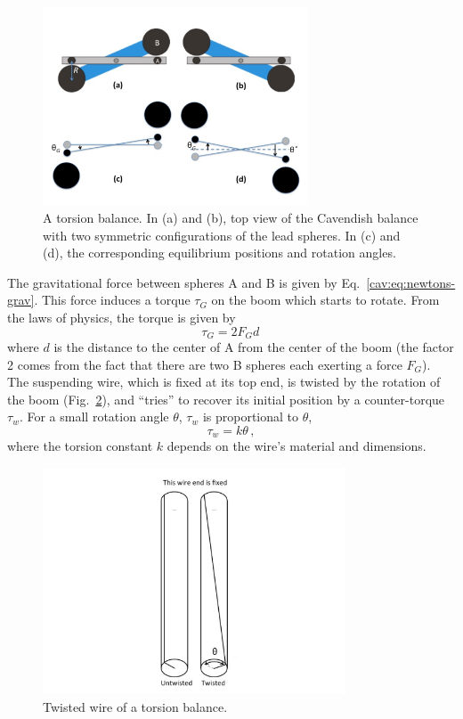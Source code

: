 \begin{figure}
	\centering
	\includegraphics[width=0.7\textwidth]{cavendish/tel-rp2111-booms}
	\caption{A torsion balance. In (a) and (b), top view of the Cavendish balance with two
		symmetric configurations of the lead spheres. In (c) and (d), the corresponding
		equilibrium positions and rotation angles.}\label{cav:fig:setup-booms}
\end{figure}

The gravitational force between spheres A and B is given by Eq.~\ref{cav:eq:newtons-grav}. This force induces a torque $\tau_G$ on the boom which starts to rotate. From the laws of
physics, the torque is given by
\begin{equation}
 \tau_G = 2 F_G d \,
\end{equation}
where $d$ is the distance to the center of A from the center of the boom (the factor 2 comes
from the fact that there are two B spheres each exerting a force $F_G$). The suspending
wire, which is fixed at its top end, is twisted by the rotation of the boom (Fig.~\ref{cav:fig:torsion}), and
``tries'' to recover its initial position by a counter-torque $\tau_w$. For a small rotation angle $\theta$,
$\tau_w$ is proportional to $\theta$,
\begin{equation}
 \tau_w = k \theta\,,
\end{equation}
where the torsion constant $k$ depends on the wire's material and dimensions.

\begin{figure}
	\centering
	\includegraphics[width=0.8\textwidth]{cavendish/torsion-balance}
	\caption{Twisted wire of a torsion balance.}\label{cav:fig:torsion}
\end{figure}

